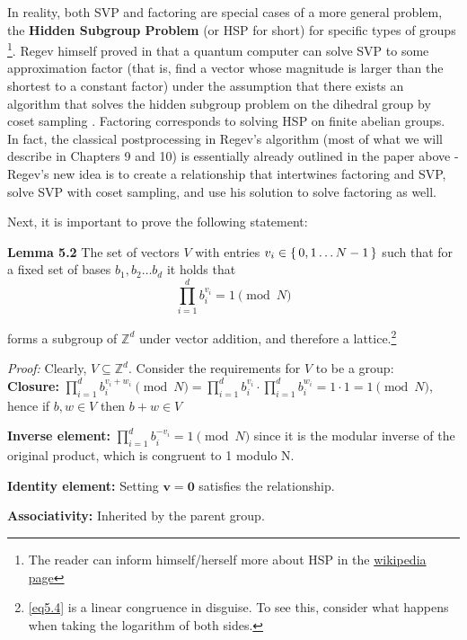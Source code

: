 In reality, both SVP and factoring are special cases of a more general problem, the \textbf{Hidden Subgroup Problem} (or HSP for short) for specific types of groups \footnote{The reader can inform himself/herself more about HSP in the \href{https://en.wikipedia.org/wiki/Hidden_subgroup_problem}{wikipedia page}}. Regev himself proved in \cite{Regev2004} that a quantum computer can solve SVP to some approximation factor (that is, find a vector whose magnitude is larger than the shortest to a constant factor) under the assumption that there exists an algorithm that solves the hidden subgroup problem on the dihedral group by coset sampling . Factoring corresponds to solving HSP on finite abelian groups. In fact, the classical postprocessing in Regev's algorithm (most of what we will describe in Chapters 9 and 10) is essentially already outlined in the paper above - Regev's new idea is to create a relationship that intertwines factoring and SVP, solve SVP with coset sampling, and use his solution to solve factoring as well.

Next, it is important to prove the following statement:

\textbf{Lemma 5.2} The set of vectors $V$ with entries $v_i \in \set{0,1\dots N-1}$ such that for a fixed set of bases $b_1,b_2\dots b_d$ it holds that
\begin{equation}
    \prod_{i=1}^d b_i^{v_i} = 1 \pmod N
    \label{eq5.4}
\end{equation}

forms a subgroup of $\mathbb{Z}^d$ under vector addition, and therefore a lattice.\footnote{\eqref{eq5.4} is a linear congruence in disguise. To see this, consider what happens when taking the logarithm of both sides.} 

\textit{Proof:} Clearly, $V \subseteq \mathbb{Z}^d$. Consider the requirements for $V$ to be a group:\\

\textbf{Closure:} $\prod_{i=1}^d b_i^{v_i+w_i} \pmod N = \prod_{i=1}^d b_i^{v_i} \cdot \prod_{i=1}^d b_i^{w_i} = 1 \cdot 1 = 1\pmod N$, hence if $b,w \in V$ then $b+w \in V$

\textbf{Inverse element:} $\prod_{i=1}^d b_i^{-v_i} = 1\pmod N$ since it is the modular inverse of the original product, which is congruent to 1 modulo N.

\textbf{Identity element:} Setting $\mathbf{v = 0}$ satisfies the relationship.

\textbf{Associativity:} Inherited by the parent group.

